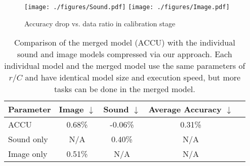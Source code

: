 \documentclass{article}
\begin{document}
	\begin{figure}[t]
		\centering
		\texttt{[image: ./figures/Sound.pdf]}
		\texttt{[image: ./figures/Image.pdf]}
		\caption{Accuracy drop vs. data ratio in calibration stage}	\label{fig:CalibrationDataRatio}
	\end{figure}
	
	\begin{table}[pt]
		\small
		\centering
		\caption{Comparison of the merged model (ACCU) with the individual sound and image models compressed via our approach. Each individual model and the merged model use the same parameters of $r/C$ and have identical model size and execution speed, but more tasks can be done in the merged model.}
		\label{LeNetMergeOrSingle}
		\begin{tabular}{lcccc}
			\toprule
			Parameter            & Image $\downarrow$            & Sound $\downarrow$       & Average Accuracy $\downarrow$      \\ \hline
			ACCU                &  0.68\%           & -0.06\%     & 0.31\%    \\ \hline
			Sound only           & N/A              & 0.40\%      & N/A                \\     
			Image only           & 0.51\%           & N/A         & N/A                \\
			\bottomrule
		\end{tabular}
	\end{table}
	
\end{document}
